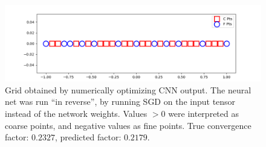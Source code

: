 \begin{figure}[h]
  \centering
  \includegraphics[scale=0.7]{figures/jacobi-conv/conv_opt_grid.png}
  \caption{Grid obtained by numerically optimizing CNN output.  The neural net was run ``in reverse'', by running SGD on the input tensor instead of the network weights.  Values $>0$ were interpreted as coarse points, and negative values as fine points.  True convergence factor: $0.2327$, predicted factor: $0.2179$.}
  \label{fig:optimized_grid}
\end{figure}


